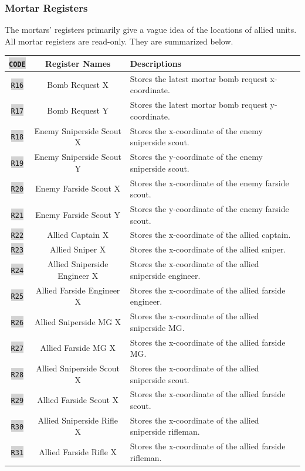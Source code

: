 \documentclass{article}
\newcommand{\vnscode}[1]{\colorbox{lightgray}{\lstinline[language=vns]{#1}}}
\begin{document}
\subsubsection{Mortar Registers}

The mortars' registers primarily give a vague idea of the locations of allied
units. All mortar registers are read-only. They are summarized below.

\begin{minipage}{\textwidth}
\centering
\begin{tabular}{|c|c|l|}
    \hline \vnscode{CODE} & Register Names & Descriptions \\ \hline
    \vnscode{R16} & Bomb Request X & Stores the latest mortar bomb request x-coordinate. \\ \hline
    \vnscode{R17} & Bomb Request Y & Stores the latest mortar bomb request y-coordinate. \\ \hline
    \vnscode{R18} & Enemy Sniperside Scout X & Stores the x-coordinate of the enemy sniperside scout. \\ \hline
    \vnscode{R19} & Enemy Sniperside Scout Y & Stores the y-coordinate of the enemy sniperside scout. \\ \hline
    \vnscode{R20} & Enemy Farside Scout X & Stores the x-coordinate of the enemy farside scout. \\ \hline
    \vnscode{R21} & Enemy Farside Scout Y & Stores the y-coordinate of the enemy farside scout. \\ \hline
    \vnscode{R22} & Allied Captain X & Stores the x-coordinate of the allied captain. \\ \hline
    \vnscode{R23} & Allied Sniper X & Stores the x-coordinate of the allied sniper. \\ \hline
    \vnscode{R24} & Allied Sniperside Engineer X & Stores the x-coordinate of the allied sniperside engineer. \\ \hline
    \vnscode{R25} & Allied Farside Engineer X & Stores the x-coordinate of the allied farside engineer. \\ \hline
    \vnscode{R26} & Allied Sniperside MG X & Stores the x-coordinate of the allied sniperside MG. \\ \hline
    \vnscode{R27} & Allied Farside MG X & Stores the x-coordinate of the allied farside MG. \\ \hline
    \vnscode{R28} & Allied Sniperside Scout X & Stores the x-coordinate of the allied sniperside scout. \\ \hline
    \vnscode{R29} & Allied Farside Scout X & Stores the x-coordinate of the allied farside scout. \\ \hline
    \vnscode{R30} & Allied Sniperside Rifle X & Stores the x-coordinate of the allied sniperside rifleman. \\ \hline
    \vnscode{R31} & Allied Farside Rifle X & Stores the x-coordinate of the allied farside rifleman. \\ \hline
\end{tabular}
\end{minipage}
\end{document}
